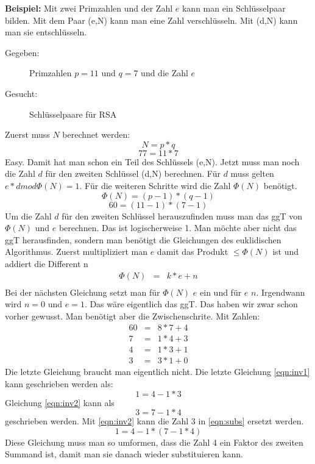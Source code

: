 \noindent \textbf{Beispiel:}
Mit zwei Primzahlen und der Zahl $e$ kann man ein Schlüsselpaar bilden. Mit dem Paar (e,N) kann man eine Zahl verschlüsseln. Mit (d,N) kann man sie entschlüsseln.
\begin{description}
\item[Gegeben:] Primzahlen $p=11$ und $q=7$ und die Zahl $e$
\item[Gesucht: ] Schlüsselpaare für RSA
\end{description}
Zuerst muss $N$ berechnet werden:
\[
N = p*q
\]
\[
77 = 11*7
\]
Easy. Damit hat man schon ein Teil des Schlüssels (e,N). Jetzt muss man noch die Zahl $d$ für den zweiten Schlüssel (d,N) berechnen. Für $d$ muss gelten $e*d mod \Phi(N) = 1$. Für die weiteren Schritte wird die Zahl $\Phi(N)$ benötigt.
\[
\Phi(N) = (p-1) * (q-1)
\]
\[
60 = (11-1) * (7-1)
\]
Um die Zahl $d$ für den zweiten Schlüssel herauszufinden muss man das ggT von $\Phi(N)$ und $e$ berechnen. Das ist logischerweise 1. Man möchte aber nicht das ggT herausfinden, sondern man benötigt die Gleichungen des euklidischen Algorithmus. Zuerst multipliziert man $e$ damit das Produkt $\leq \Phi(N)$ ist und addiert die Different n
\begin{eqnarray}
\Phi(N) & = & k * e + n \\
\end{eqnarray}
Bei der nächsten Gleichung setzt man für $\Phi(N)$ $e$ ein und für $e$ $n$. Irgendwann wird $n=0$ und $e=1$. Das wäre eigentlich das ggT. Das haben wir zwar schon vorher gewusst. Man benötigt aber die Zwischenschrite. Mit Zahlen:
\begin{eqnarray}
\label{eqn:inv3}
60 & = & 8 * 7 + 4 \\
\label{eqn:inv2}
7 & = & 1 * 4 + 3\\
\label{eqn:inv1}
4 & = & 1 * 3 + 1\\
3 & = & 3 * 1 + 0
\end{eqnarray}
Die letzte Gleichung braucht man eigentlich nicht. Die letzte Gleichung \ref{eqn:inv1} kann geschrieben werden als:
\begin{equation}
\label{eqn:subs}
1 = 4 - 1*3
\end{equation}
Gleichung \ref{eqn:inv2} kann als
\[
3 = 7 - 1*4
\]
geschrieben werden.
Mit \ref{eqn:inv2} kann die Zahl 3 in \ref{eqn:subs} ersetzt werden.  
\begin{equation}
1 = 4 - 1*(7-1*4)
\end{equation}
Diese Gleichung muss man so umformen, dass die Zahl 4 ein Faktor des zweiten Summand ist, damit man sie danach wieder substituieren kann.

